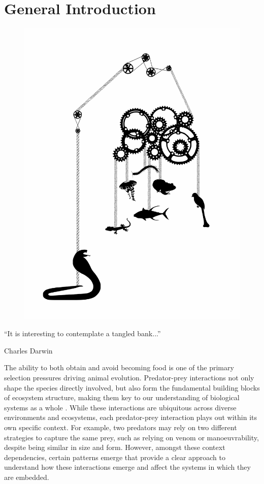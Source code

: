 \chapter{General Introduction}
\label{chap:introduction}


\begin{figure}[h]
  \centering
  \includegraphics[width=.50\textwidth]{ch1-introduction/snake_complexity.pdf}
\end{figure}

\begin{quoteshrink}
  ``It is interesting to contemplate a tangled bank...''

\hfill{Charles Darwin}
\end{quoteshrink}


\noindent
The ability to both obtain and avoid becoming food is one of the primary selection pressures driving animal evolution. Predator-prey interactions not only shape the species directly involved, but also form the fundamental building blocks of ecosystem structure, making them key to our understanding of biological systems as a whole \citep{pimm1984complexity,cohen1990community}. While these interactions are ubiquitous across diverse environments and ecosystems, each predator-prey interaction plays out within its own specific context. For example, two predators may rely on two different strategies to capture the same prey, such as relying on venom or manoeuvrability, despite being similar in size and form. However, amongst these context dependencies, certain patterns emerge that provide a clear approach to understand how these interactions emerge and affect the systems in which they are embedded.


